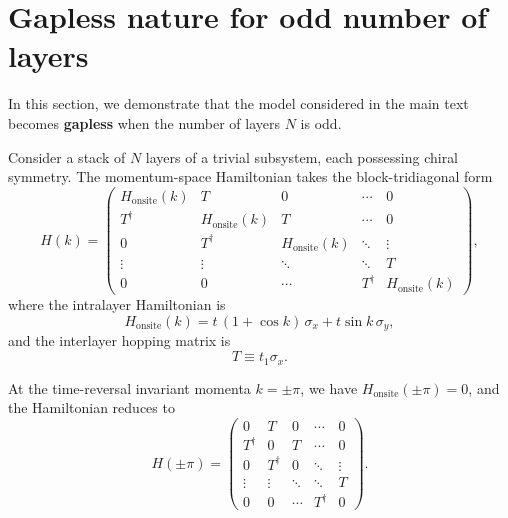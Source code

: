 \documentclass[twocolumn,english,prl,epsfig,rotate,showpacs,aps, superscriptaddress]{revtex4-2}
\begin{document}
\section{Gapless nature for odd number of layers}

In this section, we demonstrate that the model considered in the main text becomes \textbf{gapless} when the number of layers $N$ is odd.

Consider a stack of $N$ layers of a trivial subsystem, each possessing chiral symmetry. The momentum-space Hamiltonian takes the block-tridiagonal form
\begin{equation}
H(k) =
\begin{pmatrix}
H_{\mathrm{onsite}}(k) & T      & 0      & \cdots & 0      \\
T^{\dagger}            & H_{\mathrm{onsite}}(k) & T      & \cdots & 0      \\
0                      & T^{\dagger} & H_{\mathrm{onsite}}(k) & \ddots & \vdots \\
\vdots                 & \vdots & \ddots & \ddots & T      \\
0                      & 0      & \cdots & T^{\dagger} & H_{\mathrm{onsite}}(k)
\end{pmatrix},
\label{eq:Hk_full}
\end{equation}
where the intralayer Hamiltonian is
\begin{equation}
H_{\mathrm{onsite}}(k) = t\,(1+\cos k)\,\sigma_x + t\sin k\,\sigma_y,
\label{eq:H_onsite}
\end{equation}
and the interlayer hopping matrix is
\begin{equation}
T \equiv t_1 \sigma_x.
\label{eq:T_matrix}
\end{equation}

At the time-reversal invariant momenta $k = \pm\pi$, we have $H_{\mathrm{onsite}}(\pm\pi)=0$, and the Hamiltonian reduces to
\begin{equation}
H(\pm\pi) =
\begin{pmatrix}
0 & T      & 0      & \cdots & 0      \\
T^{\dagger} & 0      & T      & \cdots & 0      \\
0 & T^{\dagger} & 0      & \ddots & \vdots \\
\vdots & \vdots & \ddots & \ddots & T      \\
0 & 0      & \cdots & T^{\dagger} & 0
\end{pmatrix}.
\label{eq:H_pi}
\end{equation}
\end{document}
